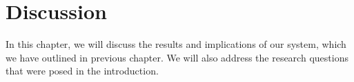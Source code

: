 \chapter{Discussion}\label{ch:discussion}

In this chapter, we will discuss the results and implications of our system, which we have outlined in previous chapter. We will also address the research questions that were posed in the introduction.

\lipsum[3]